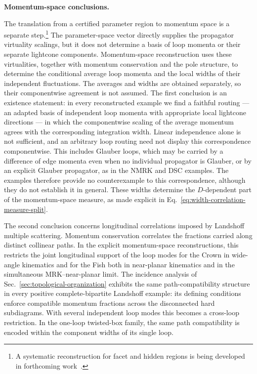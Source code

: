 \documentclass[a4paper,11pt]{article}
\begin{document}
\medskip
\noindent\textbf{Momentum-space conclusions.}\par\nopagebreak\smallskip\nopagebreak

The translation from a certified parameter region to momentum space is a
separate step.\footnote{A systematic reconstruction for facet and hidden
regions is being developed in forthcoming work~\cite{GardiZhu:2026regions}.}
The parameter-space vector directly supplies the propagator
virtuality scalings, but it does not determine a basis of loop momenta or their
separate lightcone components.  Momentum-space reconstruction uses these
virtualities, together with momentum conservation and the pole structure, to
determine the conditional average loop momenta and the local widths of their
independent fluctuations.  The averages and widths are obtained separately, so
their componentwise agreement is not assumed.
The first conclusion is an existence statement: in every reconstructed example
we find a faithful routing --- an adapted basis of independent loop momenta with
appropriate local lightcone directions --- in which the componentwise scaling
of the average momentum agrees with the corresponding integration width.
Linear independence alone is not sufficient, and an arbitrary loop routing
need not display this correspondence componentwise.
This includes Glauber loops,
which may be carried by a difference of edge momenta even when no individual
propagator is Glauber, or by an explicit Glauber propagator, as in the NMRK and
DSC examples.  The examples therefore provide no counterexample to
this correspondence, although they do not establish it in general.  These
widths determine the \(D\)-dependent part of the momentum-space
measure, as made explicit in Eq.~\eqref{eq:width-correlation-measure-split}.

The second conclusion concerns longitudinal correlations imposed by Landshoff
multiple scattering.  Momentum conservation correlates the fractions carried
along distinct collinear paths.  In the explicit momentum-space
reconstructions, this restricts the joint longitudinal support of the loop
modes for the Crown in wide-angle kinematics and for the Fish both in
near-planar kinematics and in the simultaneous MRK--near-planar limit.  The
incidence analysis of Sec.~\ref{sec:topological-organization} exhibits the same
path-compatibility structure in every positive complete-bipartite Landshoff
example: its defining conditions enforce compatible momentum fractions across
the disconnected hard subdiagrams.  With several independent loop modes this
becomes a cross-loop restriction.  In the one-loop twisted-box family, the
same path compatibility is encoded within the component widths of its single
loop.
\end{document}
